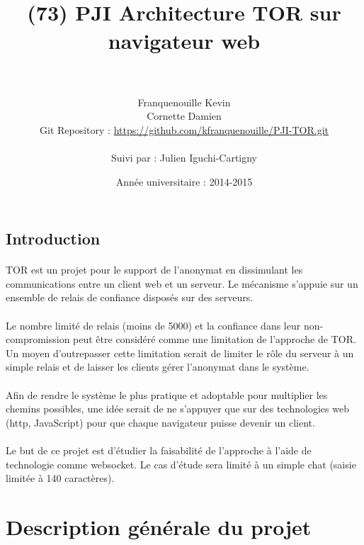\documentclass[a4paper,12pt]{report}
\title{	
		\horrule{0.5pt} \\[0.5cm]
		\huge(73) PJI Architecture TOR sur\\ navigateur web \\
		\horrule{0.5pt} \\[0.5cm]
}
\author{
		\normalfont 								\normalsize
        Franquenouille Kevin\\[-3pt]		\normalsize
       	Cornette Damien\\[-3pt]		\normalsize
       	Git Repository : \url{https://github.com/kfranquenouille/PJI-TOR.git} \\[-3pt]		\normalsize
       	\\
       	\normalfont
       	Suivi par : Julien Iguchi-Cartigny\\[-3pt]		\normalsize
}
\date{
		\normalfont 								\normalsize
        Année universitaire : 2014-2015\\[-3pt]		\normalsize
}
\begin{document}
\maketitle	

\newpage
\begin{center}
\section*{Introduction}
\end{center}
\paragraph{}
TOR est un projet pour le support de l'anonymat en dissimulant les communications entre un client web et un serveur. Le mécanisme s'appuie sur un ensemble de relais de confiance disposés sur des serveurs. 
\paragraph{} 
Le nombre limité de relais (moins de 5000) et la confiance dans leur non-compromission peut être considéré comme une limitation de l'approche de TOR. Un moyen d'outrepasser cette limitation serait de limiter le rôle du serveur à un simple relais et de laisser les clients gérer l'anonymat dans le système. 
\paragraph{}
Afin de rendre le système le plus pratique et adoptable pour multiplier les chemins possibles, une idée serait de ne s'appuyer que sur des technologies web (http, JavaScript) pour que chaque navigateur puisse devenir un client.
\paragraph{}
Le but de ce projet est d'étudier la faisabilité de l'approche à l'aide de technologie comme websocket. Le cas d'étude sera limité à un simple chat (saisie limitée à 140 caractères).


\tableofcontents

\newpage
\section{Description générale du projet}
\end{document}
